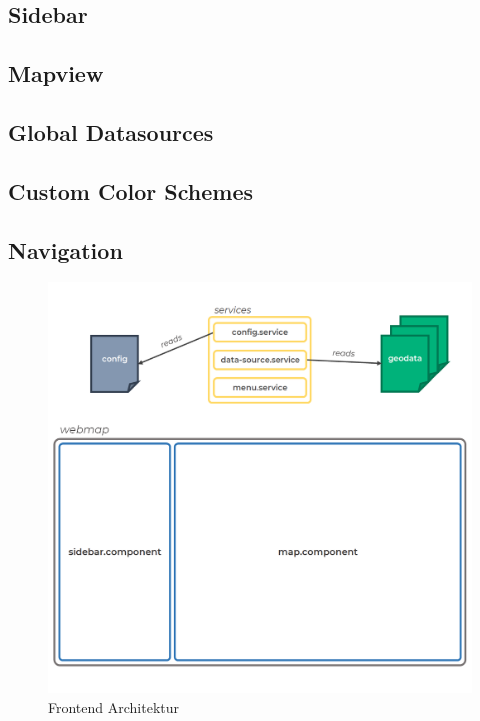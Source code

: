 \subsection{Sidebar}

\subsection{Mapview}

\subsection{Global Datasources}

\subsection{Custom Color Schemes}

\subsection{Navigation}


\begin{figure}[hbt!]
    \centering
    \includegraphics[scale=.6]{pics/frontend-architecture}
    \caption{Frontend Architektur}
    \label{fig:frontend-architecture}
\end{figure}

